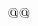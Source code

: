 $${ \uppercase{\gdef\delim@#1#2#3#4#5\delim@
  {\delim@false\ifx 6#1\ifx 7#2\ifx 8#3\ifx 9#4\delim@true
   \xdef\meaning@{#5}\fi\fi\fi\fi}}}
\def\delim@@#1"#2#3#4#5#6\delim@@{\if#32%
\let\next@\relax
 \ifx\undefined\cmbsyfam \boldnotloaded\@ne
 \else \mathcharii@#2#4#5\space \fi\fi}
\def\vert{\delimiter"026A30C }
\def\Vert{\delimiter"026B30D }
\let\|\Vert
\def\backslash{\delimiter"026E30F }
\def\boldkeydots@#1{\bold@true\let\next=#1\let\delayed@=#1\mdots@@
 \boldkey#1\bold@false}  %
\def\boldsymboldots@#1{\bold@true\let\next#1\let\delayed@#1\mdots@@
 \boldsymbol#1\bold@false}
\message{Euler fonts,}
\def\loadeufm{\loadmathfont{eufm}}
\def\loadeufb{\loadmathfont{eufb}}
\def\loadeusm{\loadmathfont{eusm}}
\def\loadeusb{\loadmathfont{eusb}}
\def\loadeurm{\loadmathfont{eurm}}
\def\loadeurb{\loadmathfont{eurb}}
\def\frak{\mathfont@\frak}
\def\frakfam{\eufmfam}
\let\goth\frak
\def\loadmathfont#1{%
   \expandafter\font@\csname ten#1\endcsname=#110
   \expandafter\font@\csname seven#1\endcsname=#17
   \expandafter\font@\csname five#1\endcsname=#15
   \edef\next{\noexpand\alloc@@8\fam\chardef\sixt@@n
     \expandafter\noexpand\csname#1fam\endcsname}%
   \next
   \textfont\csname#1fam\endcsname \csname ten#1\endcsname
   \scriptfont\csname#1fam\endcsname \csname seven#1\endcsname
   \scriptscriptfont\csname#1fam\endcsname \csname five#1\endcsname
   \expandafter\def\csname #1\expandafter\endcsname\expandafter{%
      \expandafter\mathfont@\csname#1\endcsname}%
 \expandafter\gdef\csname load#1\endcsname{}%
}
\def\mathfont@#1{\RIfM@\expandafter\mathfont@@\expandafter#1\else
  \expandafter\nonmatherr@\expandafter#1\fi}
\def\mathfont@@#1#2{{\mathfont@@@#1{#2}}}
\def\mathfont@@@#1#2{\noaccents@
   \fam\csname\expandafter\eat@\string#1fam\endcsname
   \relax#2}
\message{math accents,}
\def\accentclass@{7}
\def\noaccents@{\def\accentclass@{0}}
\def\makeacc@#1#2{\def#1{\mathaccent"\accentclass@#2 }}
\makeacc@\hat{05E}
\makeacc@\check{014}
\makeacc@\tilde{07E}
\makeacc@\acute{013}
\makeacc@\grave{012}
\makeacc@\dot{05F}
\makeacc@\ddot{07F}
\makeacc@\breve{015}
\makeacc@\bar{016}
\def\vec{\mathaccent"017E }
\newcount\skewcharcount@
\newcount\familycount@
\def\theskewchar@{\familycount@\@ne
 \global\skewcharcount@\the\skewchar\textfont\@ne                           %
 \ifnum\fam>\m@ne\ifnum\fam<16
  \global\familycount@\the\fam\relax
  \global\skewcharcount@\the\skewchar\textfont\the\fam\relax\fi\fi          %
 \ifnum\skewcharcount@>\m@ne
  \ifnum\skewcharcount@<128
  \multiply\familycount@256
  \global\advance\skewcharcount@\familycount@
  \global\advance\skewcharcount@28672
}$$
